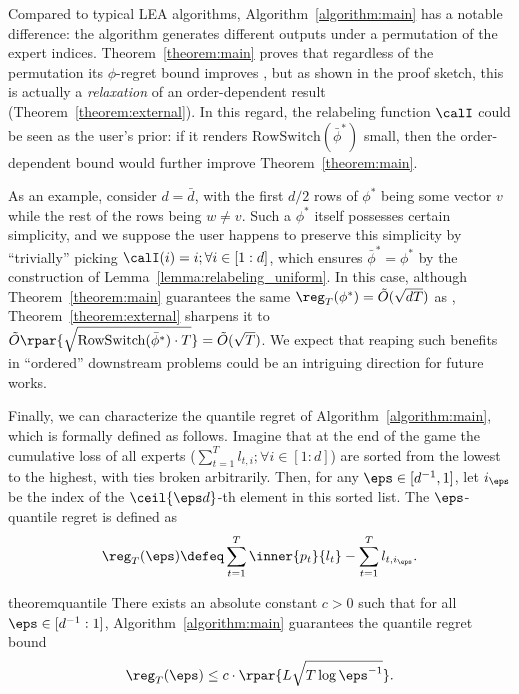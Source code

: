 \documentclass[10pt]{article}
\begin{document}
\begin{remark}\label{remark:relabeling}
Compared to typical LEA algorithms, Algorithm~\ref{algorithm:main} has a notable difference: the algorithm generates different outputs under a permutation of the expert indices. Theorem~\ref{theorem:main} proves that regardless of the permutation its $\phi$-regret bound improves \citep{blum2007external}, but as shown in the proof sketch, this is actually a \emph{relaxation} of an order-dependent result (Theorem~\ref{theorem:external}). In this regard, the relabeling function $\calI$ could be seen as the user's prior: if it renders $\mathrm{RowSwitch}(\bar\phi^*)$ small, then the order-dependent bound would further improve Theorem~\ref{theorem:main}. 

As an example, consider $d=\bar d$, with the first $d/2$ rows of $\phi^*$ being some vector $v$ while the rest of the rows being $w\neq v$. Such a $\phi^*$ itself possesses certain simplicity, and we suppose the user happens to preserve this simplicity by ``trivially'' picking $\calI(i)=i;\forall i\in[1:d]$, which ensures $\bar\phi^*=\phi^*$ by the construction of Lemma~\ref{lemma:relabeling_uniform}. In this case, although Theorem~\ref{theorem:main} guarantees the same $\reg_T(\phi^*)=\tilde O(\sqrt{dT})$ as \citep{blum2007external}, Theorem~\ref{theorem:external} sharpens it to $\tilde O\rpar{\sqrt{\mathrm{RowSwitch}(\bar\phi^*)\cdot T}}=\tilde O(\sqrt{T})$. We expect that reaping such benefits in ``ordered'' downstream problems could be an intriguing direction for future works. 
\end{remark}

Finally, we can characterize the quantile regret of Algorithm~\ref{algorithm:main}, which is formally defined as follows. Imagine that at the end of the game the cumulative loss of all experts ($\sum_{t=1}^Tl_{t,i};\forall i\in[1:d]$) are sorted from the lowest to the highest, with ties broken arbitrarily. Then, for any $\eps\in[d^{-1},1]$, let $i_\eps$ be the index of the $\ceil{\eps d}$-th element in this sorted list. The $\eps$-quantile regret is defined as
\begin{equation*}
\reg_T(\eps)\defeq \sum_{t=1}^T\inner{p_t}{l_t}-\sum_{t=1}^Tl_{t,i_\eps}.
\end{equation*}

\begin{restatable}{theorem}{quantile}\label{theorem:quantile}
There exists an absolute constant $c>0$ such that for all $\eps\in[d^{-1}:1]$, Algorithm~\ref{algorithm:main} guarantees the quantile regret bound
\begin{equation*}
\reg_T(\eps)\leq c\cdot\rpar{L\sqrt{T\log \eps^{-1}}}.
\end{equation*}
\end{restatable}
\end{document}

